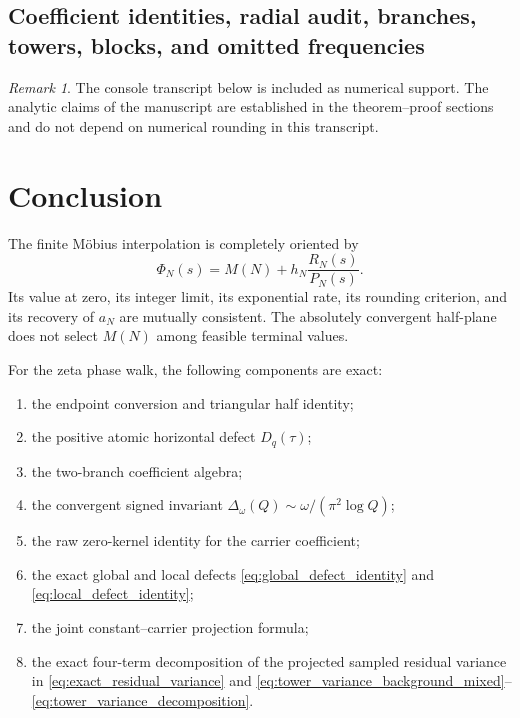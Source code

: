\documentclass[11pt]{amsart}
\numberwithin{equation}{section}
\theoremstyle{plain}
\theoremstyle{definition}
\theoremstyle{remark}
\newtheorem{remark}[theorem]{Remark}
\newcommand{\1}{\mathbf{1}}
\begin{document}
\subsection{Coefficient identities, radial audit, branches, towers, blocks,
and omitted frequencies}
\label{subsec:numerical_complete_output_tables}

\begin{remark}
\label{rem:complete_output_scope}
The console transcript below is included as numerical support.  The analytic
claims of the manuscript are established in the theorem--proof sections and
do not depend on numerical rounding in this transcript.
\end{remark}



\section{Conclusion}
\label{sec:conclusion}

The finite Möbius interpolation is completely oriented by
\begin{equation}
\Phi_N(s)
=
M(N)+h_N\frac{R_N(s)}{P_N(s)}.
\label{eq:conclusion_Phi}
\end{equation}
Its value at zero, its integer limit, its exponential rate, its rounding
criterion, and its recovery of \(a_N\) are mutually consistent.  The
absolutely convergent half-plane does not select \(M(N)\) among feasible
terminal values.

For the zeta phase walk, the following components are exact:

\begin{enumerate}[label=\textup{(\roman*)}]
\item the endpoint conversion and triangular half identity;
\item the positive atomic horizontal defect \(D_q(\tau)\);
\item the two-branch coefficient algebra;
\item the convergent signed invariant
\(\Delta_\omega(Q)\sim\omega/(\pi^2\log Q)\);
\item the raw zero-kernel identity for the carrier coefficient;
\item the exact global and local defects
\eqref{eq:global_defect_identity} and
\eqref{eq:local_defect_identity};
\item the joint constant--carrier projection formula;
\item the exact four-term decomposition of the projected sampled
residual variance in \eqref{eq:exact_residual_variance} and
\eqref{eq:tower_variance_background_mixed}--
\eqref{eq:tower_variance_decomposition}.
\end{enumerate}
\end{document}
